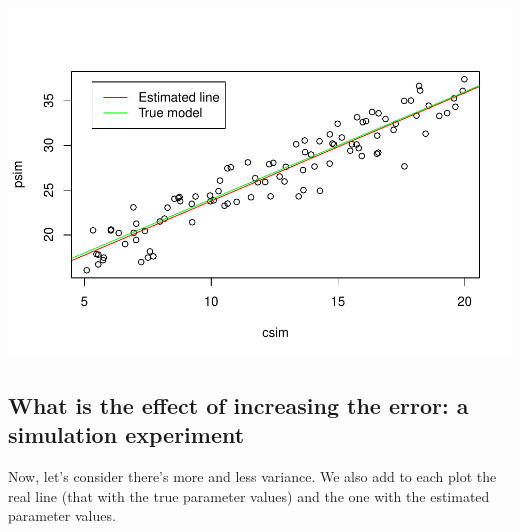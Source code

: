 \documentclass[
]{book}
\begin{document}
\includegraphics{ECOMODbook_files/figure-latex/a6.26-1.pdf}

\hypertarget{what-is-the-effect-of-increasing-the-error-a-simulation-experiment}{%
\subsection{What is the effect of increasing the error: a simulation experiment}\label{what-is-the-effect-of-increasing-the-error-a-simulation-experiment}}

Now, let's consider there's more and less variance. We also add to each plot the real line (that with the true parameter values) and the one with the estimated parameter values.
\end{document}
